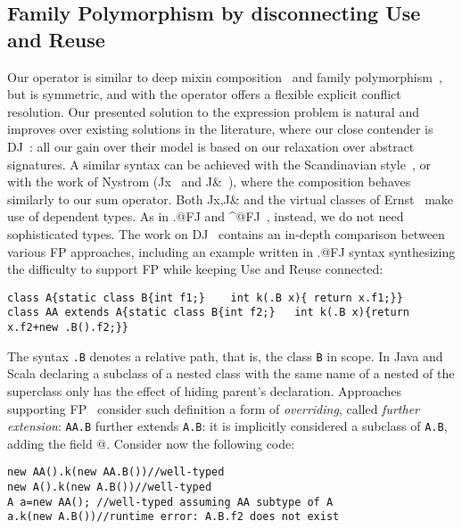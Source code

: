 \subsection{Family
Polymorphism by disconnecting Use and Reuse}
\saveSpace
Our \Q@Use@ operator is similar to deep mixin composition~\cite{Ernst99a,Zenger-Odersky2005, Hutchins06}
and family polymorphism~\cite{Ernst06, igarashi2005lightweight, IgarashiViroli07, IgarashiEtAl08}, but is symmetric, and with the operator
\Q@super@ offers a flexible  explicit conflict resolution.
Our presented solution to the expression problem is
natural and improves over existing solutions in the literature, where our close contender is DJ~\cite{deep}: all our gain over their model is based on our relaxation over abstract signatures.
A similar syntax can be achieved with the Scandinavian style~\cite{ernst2004expression}, or with the work of 
Nystrom (Jx~\cite{NystromEtAl04} and
J\&~\cite{nystrom2006j}), where the composition behaves similarly to our sum operator.
Both Jx,J\& and the virtual classes of Ernst~\cite{Ernst06}
make use of dependent types.
As in \Q@.@FJ and \Q@^@FJ~\cite{igarashi2005lightweight,IgarashiEtAl08,IgarashiViroli07,saito2008essence},
 instead, we do not need sophisticated types. 
The work on DJ~\cite{deep} contains an in-depth comparison between various FP approaches, including an example written in \Q@.@FJ syntax synthesizing the difficulty to support FP while keeping Use and Reuse connected:
\saveSpace\saveSpace
\begin{lstlisting}
class A{static class B{int f1;}    int k(.B x){ return x.f1;}}
class AA extends A{static class B{int f2;}   int k(.B x){return x.f2+new .B().f2;}}
\end{lstlisting}\saveSpace\saveSpace
The syntax \lstinline{.B} denotes a relative path, that is, the 
class \lstinline{B} in scope.
In Java and Scala declaring a subclass of a nested class with the same
name of a nested of the superclass only has the effect of hiding parent's declaration.
Approaches supporting FP~\cite{igarashi2005lightweight,IgarashiEtAl08,nystrom2006j,Ernst06,BruceEtAl98,IgarashiViroli07,deep}
consider such definition a form of \emph{overriding},
called \emph{further extension}:
\lstinline{AA.B} further extends \lstinline{A.B}: it is implicitly considered a subclass of \lstinline{A.B}, adding the field @.
Consider now the following code:
\saveSpace\saveSpace\begin{lstlisting}
new AA().k(new AA.B())//well-typed
new A().k(new A.B())//well-typed
A a=new AA(); //well-typed assuming AA subtype of A
a.k(new A.B())//runtime error: A.B.f2 does not exist
\end{lstlisting}\saveSpace\saveSpace
